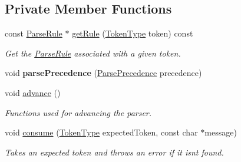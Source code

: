 \subsection*{Private Member Functions}
\begin{DoxyCompactItemize}
\item 
const \hyperlink{struct_compiler_1_1_parse_rule}{Parse\+Rule} $\ast$ \hyperlink{class_compiler_ad534a120c4dc283f635dc085afd94560}{get\+Rule} (\hyperlink{_scanner_8h_aa520fbf142ba1e7e659590c07da31921}{Token\+Type} token) const
\begin{DoxyCompactList}\small\item\em Get the \hyperlink{struct_compiler_1_1_parse_rule}{Parse\+Rule} associated with a given token. \end{DoxyCompactList}\item 
\mbox{\label{class_compiler_af5162b33664ca453c615dd9cef8938ea}} 
void {\bfseries parse\+Precedence} (\hyperlink{_compiler_8h_a916d5c37341c55c25b123d8c78439562}{Parse\+Precedence} precedence)
\end{DoxyCompactItemize}
\textbf{ }\par
\begin{DoxyCompactItemize}
\item 
void \hyperlink{class_compiler_a390358e6eaafd9e3c916307da6f8e46d}{advance} ()
\begin{DoxyCompactList}\small\item\em Functions used for advancing the parser. \end{DoxyCompactList}\item 
void \hyperlink{class_compiler_a29e8b2ba1be26ae94395865c19f2fdee}{consume} (\hyperlink{_scanner_8h_aa520fbf142ba1e7e659590c07da31921}{Token\+Type} expected\+Token, const char $\ast$message)
\begin{DoxyCompactList}\small\item\em Takes an expected token and throws an error if it isn\textquotesingle{}t found. \end{DoxyCompactList}\end{DoxyCompactItemize}

